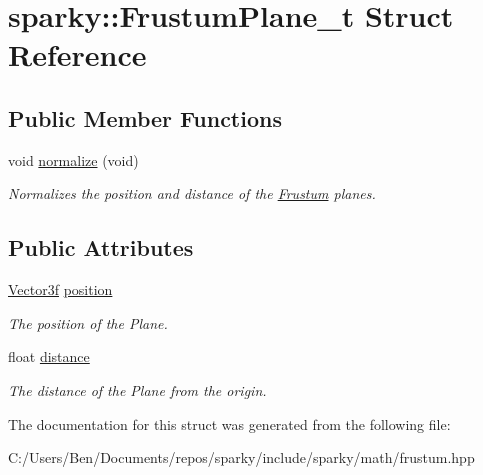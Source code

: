 \hypertarget{structsparky_1_1_frustum_plane__t}{}\section{sparky\+:\+:Frustum\+Plane\+\_\+t Struct Reference}
\label{structsparky_1_1_frustum_plane__t}
\subsection*{Public Member Functions}
\begin{DoxyCompactItemize}
\item 
void \hyperlink{structsparky_1_1_frustum_plane__t_a16ba1888941718ff8e6ee815c42e0375}{normalize} (void)\hypertarget{structsparky_1_1_frustum_plane__t_a16ba1888941718ff8e6ee815c42e0375}{}\label{structsparky_1_1_frustum_plane__t_a16ba1888941718ff8e6ee815c42e0375}

\begin{DoxyCompactList}\small\item\em Normalizes the position and distance of the \hyperlink{classsparky_1_1_frustum}{Frustum} planes. \end{DoxyCompactList}\end{DoxyCompactItemize}
\subsection*{Public Attributes}
\begin{DoxyCompactItemize}
\item 
\hyperlink{classsparky_1_1_vector3}{Vector3f} \hyperlink{structsparky_1_1_frustum_plane__t_a92bd43a84f2f9d621d6f41081448f042}{position}\hypertarget{structsparky_1_1_frustum_plane__t_a92bd43a84f2f9d621d6f41081448f042}{}\label{structsparky_1_1_frustum_plane__t_a92bd43a84f2f9d621d6f41081448f042}

\begin{DoxyCompactList}\small\item\em The position of the Plane. \end{DoxyCompactList}\item 
float \hyperlink{structsparky_1_1_frustum_plane__t_a571f2a9130395a967921ac2bc1b1303d}{distance}\hypertarget{structsparky_1_1_frustum_plane__t_a571f2a9130395a967921ac2bc1b1303d}{}\label{structsparky_1_1_frustum_plane__t_a571f2a9130395a967921ac2bc1b1303d}

\begin{DoxyCompactList}\small\item\em The distance of the Plane from the origin. \end{DoxyCompactList}\end{DoxyCompactItemize}


The documentation for this struct was generated from the following file\+:\begin{DoxyCompactItemize}
\item 
C\+:/\+Users/\+Ben/\+Documents/repos/sparky/include/sparky/math/frustum.\+hpp\end{DoxyCompactItemize}
